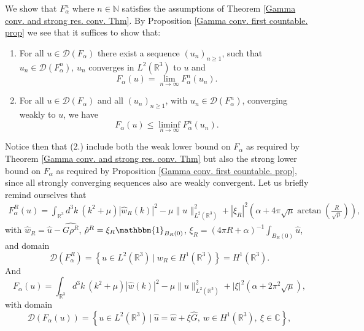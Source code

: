 \documentclass[a4paper,11pt]{article}
\newcommand{\dom}[1]{\mathscr D\left(#1\right)}
\newcommand{\R}{\mathbb{R}}
\newcommand{\C}{\mathbb{C}}
\numberwithin{equation}{section}
\begin{document}
We show that $ F_\alpha^n $ where $ n\in\mathbb{N} $ satisfies the assumptions of Theorem \ref{Gamma conv. and strong res. conv. Thm}. By Proposition \ref{Gamma conv. first countable. prop} we see that it suffices to show that:\\
\begin{enumerate}
	\item For all $ u\in \dom{F_\alpha} $ there exist a sequence $ (u_n)_{n\geq1}$, such that $u_n\in \dom{F^n_\alpha} $, $ u_n $ converges in $ L^2(\R^3) $ to $ u $ and \begin{equation}
	F_\alpha(u)=\lim\limits_{n\to\infty}F^n_\alpha(u_n).
	\end{equation}
	\item For all $ u\in\dom{F_\alpha} $ and all $ (u_n)_{n\geq1} $, with $ u_n\in\dom{F_\alpha^n} $, converging weakly to $ u $, we have\begin{equation}
	F_\alpha(u)\leq\liminf_{n\to\infty}F_\alpha^n(u_n).
	\end{equation} 
\end{enumerate}
Notice then that (2.) include both the weak lower bound on $ F_\alpha $ as required by Theorem \ref{Gamma conv. and strong res. conv. Thm} but also the strong lower bound on $ F_\alpha $ as required by Proposition \ref{Gamma conv. first countable. prop}, since all strongly converging sequences also are weakly convergent.
Let us briefly remind ourselves that 
\begin{equation}
\begin{aligned}
F_\alpha^R(u)=\int_{\R^3} d^3k\ \left(k^2+\mu\right)|\hat{w}_R(k)|^2-\mu\|u\|^2_{L^2(\R^3)}+|\xi_R|^2\left(\alpha+4\pi\sqrt{\mu}\arctan\left(\frac{R}{\sqrt{\mu}}\right)\right),
\end{aligned}
\end{equation}
with $ \hat{w}_R=\hat{u}-\widehat{G\rho^R} $, $ \hat{\rho}^R=\xi_R\mathbbm{1}_{B_R(0)}  $, $ \xi_R=(4\pi R+\alpha)^{-1}\int_{B_R(0)}\hat{u} $, and domain \begin{equation}
\dom{F_\alpha^R}=\left\{u\in L^2(\R^3)\ |\ w_R\in H^1(\R^3) \right\}=H^1(\R^3).
\end{equation}
And 
\begin{equation}
F_\alpha(u)=\int_{\R^3} d^3k\ \left(k^2+\mu\right)|\hat{w}(k)|^2-\mu\|u\|^2_{L^2(\R^3)}+|\xi|^2\left(\alpha+2\pi^2\sqrt{\mu}\right),
\end{equation}
with domain\begin{equation}
\dom{F_\alpha(u)}=\left\{u\in L^2(\R^3) \ |\ \hat{u}=\hat{w}+\xi\hat{G},\ w\in H^1(\R^3),\ \xi\in\C \right\},
\end{equation}
\end{document}
